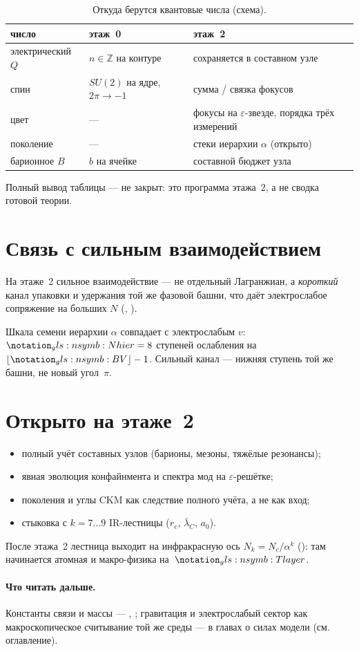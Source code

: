 \begin{table}[htbp]
  \centering
  \caption{Откуда берутся квантовые числа (схема).}
  \label{tab:floor2-qnumbers}
  \begin{tabular}{@{}lll@{}}
    \toprule
    число & этаж~0 & этаж~2 \\
    \midrule
    электрический $Q$ & $n\in\mathbb{Z}$ на контуре & сохраняется в составном узле \\
    спин & $SU(2)$ на ядре, $2\pi\to -1$ & сумма / связка фокусов \\
    цвет & --- & фокусы на $\varepsilon$-звезде, порядка трёх измерений \\
    поколение & --- & стеки иерархии $\alpha$ (открыто) \\
    барионное $B$ & $b$ на ячейке & составной бюджет узла \\
    \bottomrule
  \end{tabular}
\end{table}

Полный вывод таблицы --- не закрыт: это программа этажа~2,
а не сводка готовой теории.

\section{Связь с сильным взаимодействием}
\label{sec:floor2-strong}

На этаже~2 сильное взаимодействие --- не отдельный Лагранжиан,
а \emph{короткий} канал упаковки и удержания той же фазовой башни,
что даёт электрослабое сопряжение на больших $N$
(, ).

Шкала семени иерархии $\alpha$ совпадает с электрослабым $v$:
$\vevHierarchySteps=8$ ступеней ослабления на $\lfloor \caBitBudget\rfloor-1$.
Сильный канал --- нижняя ступень той же башни, не новый угол~$\pi$.

\section{Открыто на этаже~2}
\label{sec:floor2-open}

\begin{itemize}[noitemsep]
\item полный учёт составных узлов (барионы, мезоны, тяжёлые резонансы);
\item явная эволюция конфайнмента и спектра мод на $\varepsilon$-решётке;
\item поколения и углы CKM как следствие полного учёта, а не как вход;
\item стыковка с $k=7\ldots 9$ IR-лестницы ($r_e$, $\bar\lambda_C$, $a_0$).
\end{itemize}

После этажа~2 лестница выходит на инфракрасную ось
$N_k=N_c/\alpha^{k}$ (): там начинается атомная и макро-физика на~$\layerMacro$.

\paragraph{Что читать дальше.}
Константы связи и массы --- , ;
гравитация и электрослабый сектор как макроскопическое считывание той же среды --- в главах о силах модели
(см. оглавление).
